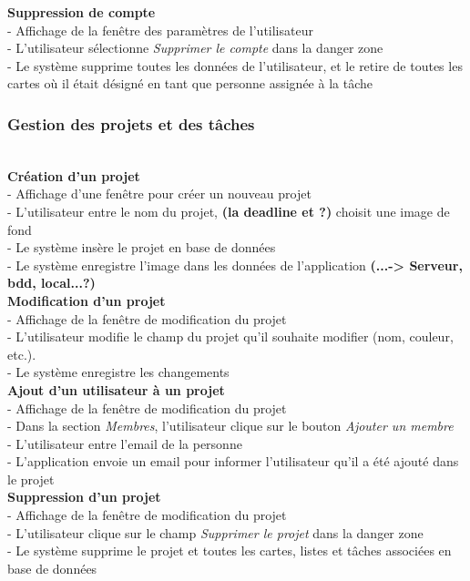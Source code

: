 \documentclass[conference]{IEEEtran}
\begin{document}
\textbf{Suppression de compte}\\
- Affichage de la fenêtre des paramètres de l'utilisateur\\
- L'utilisateur sélectionne \textit{Supprimer le compte} dans la danger zone\\
- Le système supprime toutes les données de l'utilisateur, et le retire de toutes les cartes où il était désigné en tant que personne assignée à la tâche\\

\subsubsection{Gestion des projets et des tâches}\hfil\\

\textbf{Création d'un projet}\\
- Affichage d'une fenêtre pour créer un nouveau projet\\
- L'utilisateur entre le nom du projet, \textbf{(la deadline et ?)} choisit une image de fond\\
- Le système insère le projet en base de données\\
- Le système enregistre l'image dans les données de l'application \textbf{(...-> Serveur, bdd, local...?)}\\

\textbf{Modification d'un projet}\\
- Affichage de la fenêtre de modification du projet\\
- L'utilisateur modifie le champ du projet qu'il souhaite modifier (nom, couleur, etc.).\\
- Le système enregistre les changements\\

\textbf{Ajout d'un utilisateur à un projet}\\
- Affichage de la fenêtre de modification du projet\\
- Dans la section \textit{Membres}, l'utilisateur clique sur le bouton \textit{Ajouter un membre}\\
- L'utilisateur entre l'email de la personne\\
- L'application envoie un email pour informer l'utilisateur qu'il a été ajouté dans le projet\\

\textbf{Suppression d'un projet}\\
- Affichage de la fenêtre de modification du projet\\
- L'utilisateur clique sur le champ \textit{Supprimer le projet} dans la danger zone\\
- Le système supprime le projet et toutes les cartes, listes et tâches associées en base de données\\
\end{document}
